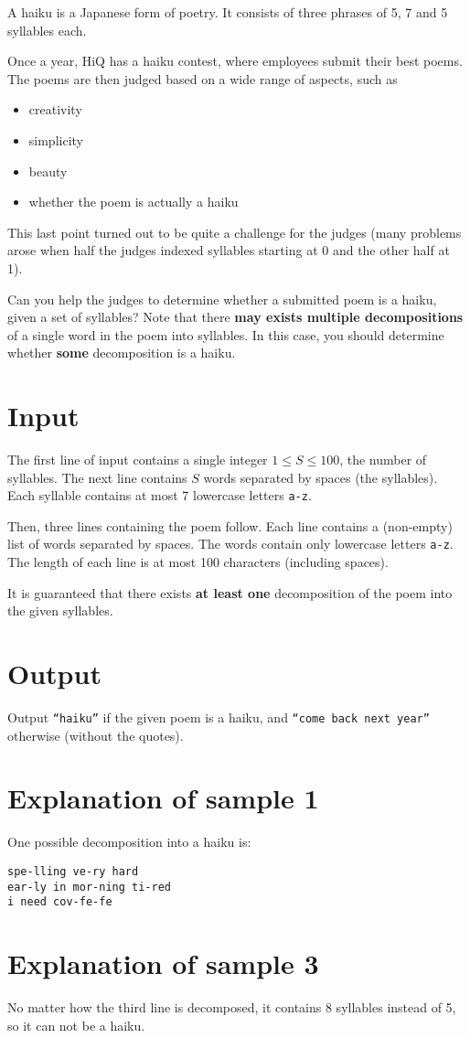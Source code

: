 A haiku is a Japanese form of poetry.
It consists of three phrases of 5, 7 and 5 syllables each.

Once a year, HiQ has a haiku contest, where employees submit their best poems.
The poems are then judged based on a wide range of aspects, such as
\begin{itemize}
    \item creativity
    \item simplicity
    \item beauty
    \item whether the poem is actually a haiku
\end{itemize}
This last point turned out to be quite a challenge for the judges (many problems arose when half the judges indexed syllables starting at 0 and the other half at 1).

Can you help the judges to determine whether a submitted poem is a haiku, given a set of syllables?
Note that there \textbf{may exists multiple decompositions} of a single word in the poem into syllables.
In this case, you should determine whether \textbf{some} decomposition is a haiku.

\section*{Input}
The first line of input contains a single integer $1 \le S \le 100$, the number of syllables.
The next line contains $S$ words separated by spaces (the syllables).
Each syllable contains at most 7 lowercase letters \texttt{a-z}.

Then, three lines containing the poem follow.
Each line contains a (non-empty) list of words separated by spaces.
The words contain only lowercase letters \texttt{a-z}.
The length of each line is at most 100 characters (including spaces).

It is guaranteed that there exists \textbf{at least one} decomposition of the poem into the given syllables.

\section*{Output}
Output \texttt{``haiku''} if the given poem is a haiku, and \texttt{``come back next year''} otherwise (without the quotes).

\section*{Explanation of sample 1}
One possible decomposition into a haiku is:
\begin{verbatim}
spe-lling ve-ry hard
ear-ly in mor-ning ti-red
i need cov-fe-fe
\end{verbatim}

\section*{Explanation of sample 3}
No matter how the third line is decomposed, it contains 8 syllables instead of 5, so it can not be a haiku.
